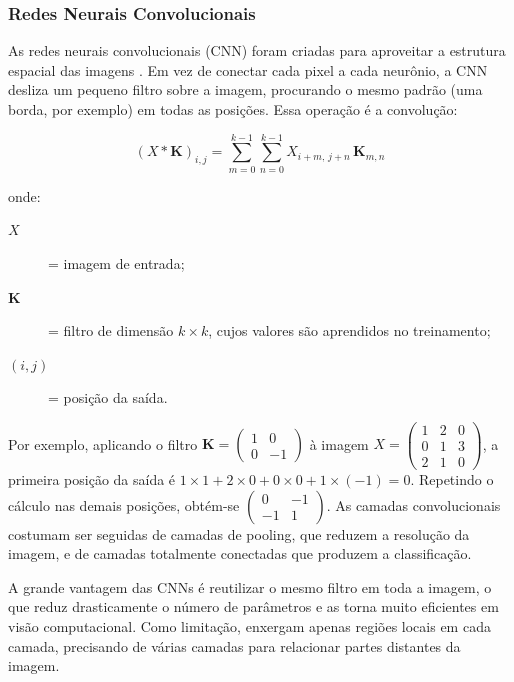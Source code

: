 \subsubsection{Redes Neurais Convolucionais}

As redes neurais convolucionais (CNN) foram criadas para aproveitar a estrutura espacial das imagens \cite{LeCun1998}. Em vez de conectar cada pixel a cada neurônio, a CNN desliza um pequeno filtro sobre a imagem, procurando o mesmo padrão (uma borda, por exemplo) em todas as posições. Essa operação é a convolução:

\begin{equation} \label{eq:conv}
(X * \mathbf{K})_{i,j} = \sum_{m=0}^{k-1} \sum_{n=0}^{k-1} X_{i+m,\, j+n} \, \mathbf{K}_{m,n}
\end{equation}

\noindent onde:
\begin{description}
  \item[$X$] = imagem de entrada;
  \item[$\mathbf{K}$] = filtro de dimensão $k \times k$, cujos valores são aprendidos no treinamento;
  \item[$(i, j)$] = posição da saída.
\end{description}

Por exemplo, aplicando o filtro $\mathbf{K} = \left(\begin{smallmatrix} 1 & 0 \\ 0 & -1 \end{smallmatrix}\right)$ à imagem $X = \left(\begin{smallmatrix} 1 & 2 & 0 \\ 0 & 1 & 3 \\ 2 & 1 & 0 \end{smallmatrix}\right)$, a primeira posição da saída é $1 \times 1 + 2 \times 0 + 0 \times 0 + 1 \times (-1) = 0$. Repetindo o cálculo nas demais posições, obtém-se $\left(\begin{smallmatrix} 0 & -1 \\ -1 & 1 \end{smallmatrix}\right)$. As camadas convolucionais costumam ser seguidas de camadas de pooling, que reduzem a resolução da imagem, e de camadas totalmente conectadas que produzem a classificação.

A grande vantagem das CNNs é reutilizar o mesmo filtro em toda a imagem, o que reduz drasticamente o número de parâmetros e as torna muito eficientes em visão computacional. Como limitação, enxergam apenas regiões locais em cada camada, precisando de várias camadas para relacionar partes distantes da imagem.

